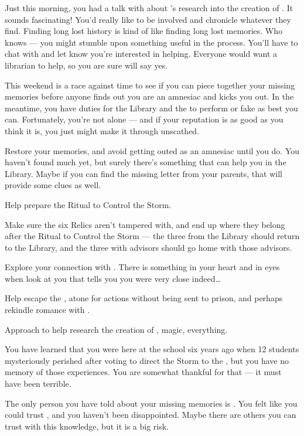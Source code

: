 \documentclass[char]{GL2020}
\begin{document}
Just this morning, you had a talk with \cBeetle{\full} about \cEbbPriest{\full}'s research into the creation of \pEarth{}. It sounds fascinating! You'd really like to be involved and chronicle whatever they find. Finding long lost history is kind of like finding long lost memories. Who knows — you might stumble upon something useful in the process. You'll have to chat with \cEbbPriest{} and let \cEbbPriest{\them} know you're interested in helping. Everyone would want a librarian to help, so you are sure \cEbbPriest{} will say yes.

This weekend is a race against time to see if you can piece together your missing memories before anyone finds out you are an amnesiac and kicks you out. In the meantime, you have duties for the Library and the \pSc{} to perform or fake as best you can. Fortunately, you're not alone — and if your reputation is as good as you think it is, you just might make it through unscathed.

\begin{itemz}
    \item Restore your memories, and avoid getting outed as an amnesiac until you do. You haven't found much yet, but surely there's something that can help you in the Library. Maybe if you can find the missing letter from your parents, that will provide some clues as well.
    \item Help prepare the Ritual to Control the Storm.
    \item Make sure the six Relics aren't tampered with, and end up where they belong after the Ritual to Control the Storm — the three from the Library should return to the Library, and the three with advisors should go home with those advisors.
    \item Explore your connection with \cInterpol{}. There is something in your heart and in \cInterpol{\their} eyes when \cInterpol{\they} look\cInterpol{\verbs} at you that tells you you were very close indeed\ldots
    \item Help \cChupAvenger{} escape the \pGoaties{}, atone for \cChupAvenger{\their} actions without being sent to prison, and perhaps rekindle \cChupAvenger{\their} romance with \cHeadScientist{}.
    \item Approach \cEbbPriest{} to help research the creation of \pEarth{}, magic, everything.
\end{itemz}

\begin{itemz}[Notes]
    \item You have learned that you were here at the school six years ago when 12 students mysteriously perished after voting to direct the Storm to the \pShip{}, but you have no memory of those experiences. You are somewhat thankful for that — it must have been terrible.
    \item The only person you have told about your missing memories is \cInterpol{}. You felt like you could trust \cInterpol{\them}, and you haven’t been disappointed. Maybe there are others you can trust with this knowledge, but it is a big risk.
\end{itemz}
\end{document}
